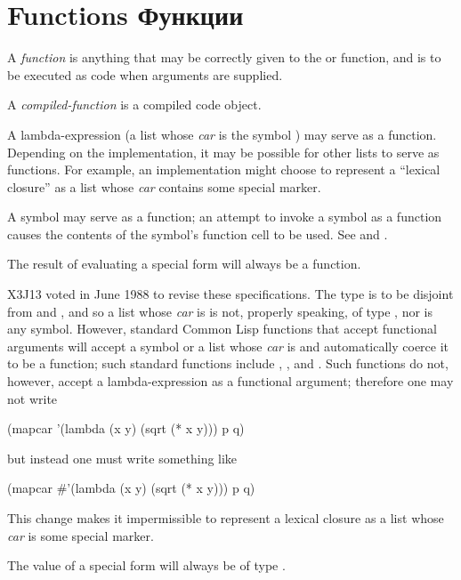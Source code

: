 \section{Functions Функции}
\label{FUNCTION-TYPE-SECTION}

\begin{obsolete}
A \emph{function} is anything that may be correctly given to the 
or  function, and is
to be executed as code when arguments are supplied.

A \emph{compiled-function} is a compiled code object.

A lambda-expression
(a list whose \emph{car} is the symbol ) may serve as a function.
Depending on the implementation, it may be possible for other lists to
serve as functions.  For example, an implementation might choose to
represent a ``lexical closure'' as a list whose \emph{car} contains some
special marker.

A symbol may serve as a function; an attempt to invoke a symbol as a function
causes the contents of the symbol's function cell to be used.
See  and .

The result of evaluating a  special form
will always be a function.
\end{obsolete}

\begin{newer}
X3J13 voted in June 1988 
to revise these specifications.  The type  is to be disjoint
from  and , and so a list whose \emph{car} is 
is not, properly speaking, of type , nor is any symbol.
However,
standard Common Lisp functions that accept functional arguments
will accept a symbol or a list whose \emph{car} is 
and automatically coerce it to be a function; such standard
functions include , , and .
Such functions do not, however, accept a lambda-expression as a functional
argument; therefore one may not write

\vskip 3pt
\begin{lisp}
(mapcar '(lambda (x y) (sqrt (* x y))) p q)
\end{lisp}
but instead one must write something like
\begin{lisp}
(mapcar \#'(lambda (x y) (sqrt (* x y))) p q)
\end{lisp}

This change makes it impermissible to represent a lexical closure
as a list whose \emph{car} is some special marker.

The value of a  special form
will always be of type .
\end{newer}

